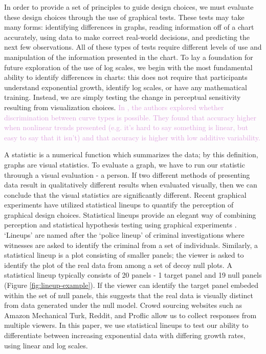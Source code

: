 \documentclass[]{interact}
\theoremstyle{plain}%
\theoremstyle{definition}
\theoremstyle{remark}
\begin{document}
In order to provide a set of principles to guide design choices, we must
evaluate these design choices through the use of graphical tests. These
tests may take many forms: identifying differences in graphs, reading
information off of a chart accurately, using data to make correct
real-world decisions, and predicting the next few observations. All of
these types of tests require different levels of use and manipulation of
the information presented in the chart. To lay a foundation for future
exploration of the use of log scales, we begin with the most fundamental
ability to identify differences in charts: this does not require that
participants understand exponential growth, identify log scales, or have
any mathematical training. Instead, we are simply testing the change in
perceptual sensitivity resulting from visualization choices.
\textcolor{Plum}{In \cite{best_perception_2007}, the authors explored whether discrimination between curve types is possible.
They found that accuracy higher when nonlinear trends presented (e.g. it’s hard to say something is linear, but easy to say that it isn’t) and that accuracy is higher with low additive variability.}

A statistic is a numerical function which summarizes the data; by this
definition, graphs are visual statistics. To evaluate a graph, we have
to run our statistic throuugh a visual evaluation - a person. If two
different methods of presenting data result in qualitatively different
results when evaluated visually, then we can conclude that the visual
statistics are significantly different. Recent graphical experiments
have utilized statistical lineups to quantify the perception of
graphical design
choices\citep{vanderplas_clusters_2017, hofmann_graphical_2012, loyVariationsQQPlots2016}.
Statistical lineups provide an elegant way of combining perception and
statistical hypothesis testing using graphical experiments
\citep{wickham2010graphical, majumder_validation_2013, vanderplas_statistical_nodate}.
`Lineups' are named after the `police lineup' of criminal investigations
where witnesses are asked to identify the criminal from a set of
individuals. Similarly, a statistical lineup is a plot consisting of
smaller panels; the viewer is asked to identify the plot of the real
data from among a set of decoy null plots. A statistical lineup
typically consists of 20 panels - 1 target panel and 19 null panels
(Figure \ref{fig:lineup-example}). If the viewer can identify the target
panel embeded within the set of null panels, this suggests that the real
data is visually distinct from data generated under the null model.
Crowd sourcing websites such as Amazon Mechanical Turk, Reddit, and
Proflic allow us to collect responses from multiple viewers. In this
paper, we use statistical lineups to test our ability to differentiate
between increasing exponential data with differing growth rates, using
linear and log scales.
\end{document}
